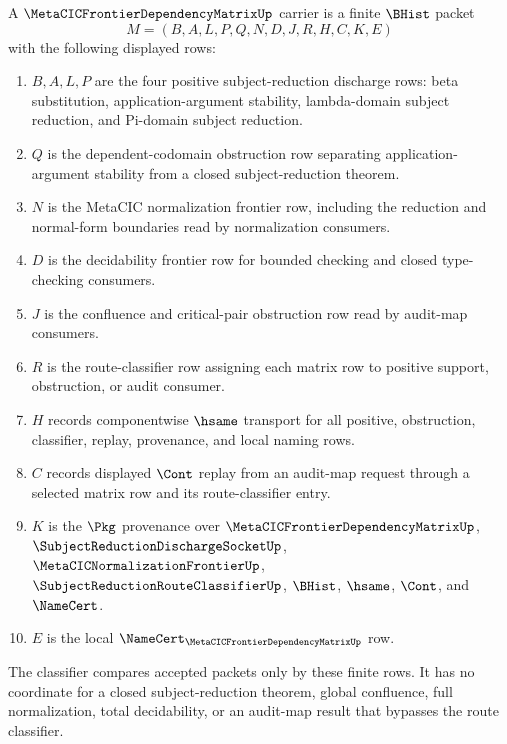 \begin{definition}
\label{def:metacic-frontier-dependency-matrix-carrier}
A $\MetaCICFrontierDependencyMatrixUp$ carrier is a finite $\BHist$ packet
$$
M=(B,A,L,P,Q,N,D,J,R,H,C,K,E)
$$
with the following displayed rows:
\begin{enumerate}
\item $B,A,L,P$ are the four positive subject-reduction discharge rows: beta substitution, application-argument stability, lambda-domain subject reduction, and Pi-domain subject reduction.
\item $Q$ is the dependent-codomain obstruction row separating application-argument stability from a closed subject-reduction theorem.
\item $N$ is the MetaCIC normalization frontier row, including the reduction and normal-form boundaries read by normalization consumers.
\item $D$ is the decidability frontier row for bounded checking and closed type-checking consumers.
\item $J$ is the confluence and critical-pair obstruction row read by audit-map consumers.
\item $R$ is the route-classifier row assigning each matrix row to positive support, obstruction, or audit consumer.
\item $H$ records componentwise $\hsame$ transport for all positive, obstruction, classifier, replay, provenance, and local naming rows.
\item $C$ records displayed $\Cont$ replay from an audit-map request through a selected matrix row and its route-classifier entry.
\item $K$ is the $\Pkg$ provenance over $\MetaCICFrontierDependencyMatrixUp$, $\SubjectReductionDischargeSocketUp$, $\MetaCICNormalizationFrontierUp$, $\SubjectReductionRouteClassifierUp$, $\BHist$, $\hsame$, $\Cont$, and $\NameCert$.
\item $E$ is the local $\NameCert_{\MetaCICFrontierDependencyMatrixUp}$ row.
\end{enumerate}
The classifier compares accepted packets only by these finite rows. It has no coordinate for a closed subject-reduction theorem, global confluence, full normalization, total decidability, or an audit-map result that bypasses the route classifier.
\end{definition}

